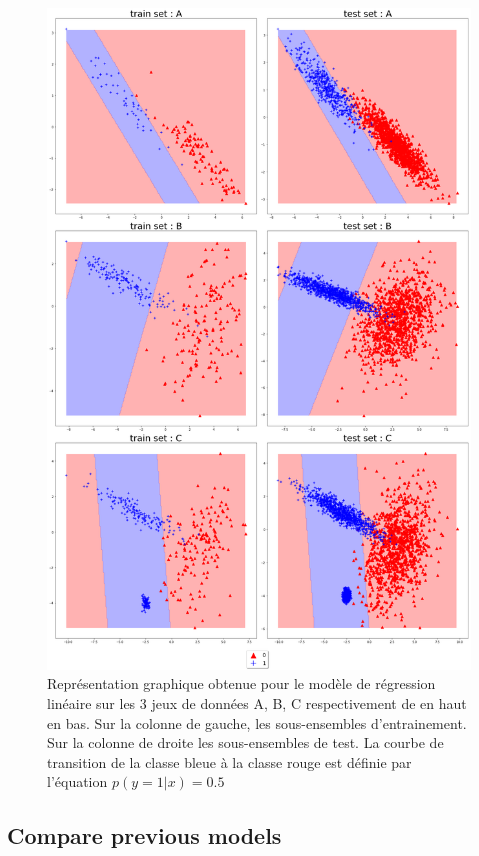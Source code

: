 \documentclass[12pt,a4paper,onecolumn]{article}
\begin{document}
\begin{figure}[H]
	\centering
	\includegraphics[height = 0.9\textheight]{linear}
	\caption{Représentation graphique obtenue pour le modèle de régression linéaire sur les 3 jeux de données A, B, C respectivement de en haut en bas. Sur la colonne de gauche, les sous-ensembles d'entrainement. Sur la colonne de droite les sous-ensembles de test. La courbe de transition de la classe bleue à la classe rouge est définie par l'équation \( p(y = 1 | x) = 0.5\)}
	\label{fig:linear}
\end{figure}

\subsection{Compare previous models}
\end{document}

